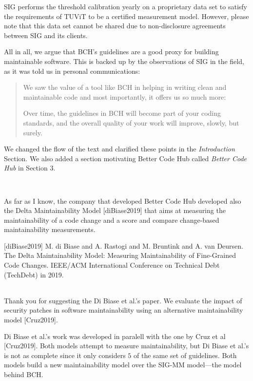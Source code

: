 \documentclass[11pt,fleqn]{article}
\newcommand{\eline}{\vspace*{.75\baselineskip}}
\newcommand{\Referee}[1]{\eline \noindent {\bf Reviewer comment #1:} \\}
\newcommand{\Us}{\eline \noindent {\bf Response:}\\}
\newenvironment{revcomment}[1][]
{\Referee{#1}\begin{rcomment}}
{\end{rcomment}}
\begin{document}
SIG performs the threshold calibration
yearly on a proprietary data set to satisfy the requirements of TUViT to
be a certified measurement model. However, please note that this data set 
cannot be shared due to non-disclosure agreements between SIG and its 
clients.

All in all, we argue that BCH's guidelines are a good proxy for building maintainable software. This is 
backed up by the observations of SIG in the field, as it was told us in personal communications: 

\begin{quote}
We saw the value of a tool like BCH in helping in writing clean and maintainable code and most importantly, 
it offers us so much more:

Over time, the guidelines in BCH will become part of your coding standards, and the overall quality of your 
work will improve, slowly, but surely.
\end{quote}

We changed the flow of the text and clarified these points in the \emph{Introduction} Section. We also 
added a section motivating Better Code Hub called \emph{Better Code Hub} in Section $3$.

\begin{revcomment}[1.2]

    As far as I know, the company that developed Better Code Hub 
    developed also the Delta Maintainability Model [diBiase2019] 
    that aims at measuring the maintainability of a code change 
    and a score and compare change-based maintainability measurements.

    [diBiase2019] M. di Biase and A. Rastogi and M. Bruntink and A. van 
    Deursen. The Delta Maintainability Model: Measuring Maintainability 
    of Fine-Grained Code Changes. IEEE/ACM International Conference 
    on Technical Debt (TechDebt) in 2019.

\end{revcomment}

\Us Thank you for suggesting the Di Biase et al.'s paper. 
We evaluate the impact of security patches in software 
maintainability using an alternative maintainability model [Cruz2019]. 

Di Biase et al.'s work was developed in paralell with the one by Cruz et al [Cruz2019]. 
Both models attempt to measure maintainability, but Di Biase et al.'s is not as complete 
since it only considers $5$ of the same set of guidelines. Both models build a 
new maintainability model over the SIG-MM model---the model behind BCH. 
\end{document}
